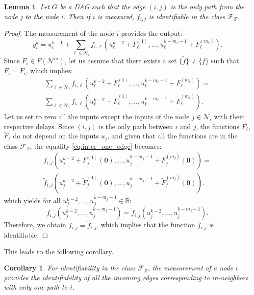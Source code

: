 \documentclass[letterpaper,10pt,journal]{IEEEtran}
\newcommand{\Fone}{\mathcal{F}_Z}
\newtheorem{corollary}{Corollary}
\newtheorem{lemma}{Lemma}
\newcommand{\R}{\mathbb R}
\newcommand{\NN}{\mathcal{N}}
\newcommand{\zero}{\mathbf{0}}
\begin{document}
\begin{lemma}\label{lemma:sinks}
Let $G$ be a DAG such that the edge $(i,j)$ is the only path from the node $j$ to the node $i$. Then if $i$ is measured, $f_{i,j}$ is identifiable in the class $\Fone$.
\end{lemma}
\begin{proof}
The measurement of the node $i$ provides the output:
\begin{equation}\label{eq:F_incoming_edges}
 y_i^k=u_i^{k-1}+ \sum_{\ell\in\NN_i}f_{i,\ell}(u_{\ell}^{k-2}+ F_{\ell}^{(1)},\ldots,u_{\ell}^{k-m_{\ell}-1}+ F_{\ell}^{(m_{\ell})}).
\end{equation}
Since $F_i\in F(\NN^m)$, let us assume that there exists a set $\{\tilde f\}\neq \{ f\}$ such that $F_i=\tilde F_i$, which implies:
\begin{multline}\label{eq:inter_one_edge}
    \sum_{\ell\in\NN_i}f_{i,\ell}(u_{\ell}^{k-2}+ F_{\ell}^{(1)},\ldots,u_{\ell}^{k-m_{\ell}-1}+ F_{\ell}^{(m_{\ell})})=\\\sum_{\ell\in\NN_i}\tilde f_{i,\ell}(u_{\ell}^{k-2}+ \tilde F_{\ell}^{(1)},\ldots,u_{\ell}^{k-m_{\ell}-1}+ \tilde F_{\ell}^{(m_{\ell})}).
\end{multline}
Let us set to zero all the inputs except the inputs of the node $j\in\NN_i$ with their respective delays. Since $(i,j)$ is the only path between $i$ and $j$, the functions $F_\ell$, $\tilde F_\ell$ do not depend on the inputs $u_j$, and given that all the functions are in the class $\Fone$, the equality \eqref{eq:inter_one_edge} becomes:
\begin{multline*}
    f_{i,j}(u_{j}^{k-2}+ F_{j}^{(1)}(\zero),\ldots,u_{j}^{k-m_{j}-1}+ F_{j}^{(m_{j})}(\zero))=\\ \tilde f_{i,j}(u_{j}^{k-2}+ \tilde F_{j}^{(1)}(\zero),\ldots,u_{j}^{k-m_{j}-1}+ \tilde F_{j}^{(m_{j})}(\zero)).
\end{multline*}
which yields for all $u_j^{k-2},\ldots,u_j^{k-m_j-1}\in\R$:
$$
f_{i,j}(u_j^{k-2},\ldots,u_j^{k-m_j-1})=\tilde f_{i,j}(u_j^{k-2},\ldots,u_j^{k-m_j-1}). 
$$
Therefore, we obtain $f_{i,j}=\tilde f_{i,j}$, which implies that the function $f_{i,j}$ is identifiable.
\end{proof}

This leads to the following corollary.

\begin{corollary}\label{corr:sinks}
    For identifiability in the class $\Fone$, the measurement of a node $i$ provides the identifiability of all the incoming edges corresponding to in-neighbors with only one path to $i$.
\end{corollary}
\end{document}
